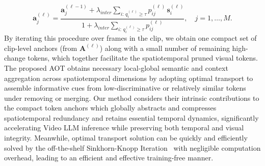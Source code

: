 \begin{equation}
    \mathbf{a}^{(\ell)}_j
    =
    \frac{
        \mathbf{a}^{(\ell-1)}_j
        +
        \lambda_{inter}
        \sum_{i:\,q^{(\ell)}_i \ge \tau}
        p^{(\ell)}_{ij}\,\mathbf{s}^{(\ell)}_i
    }{
        1
        +
        \lambda_{inter}
        \sum_{i:\,q^{(\ell)}_i \ge \tau}
        p^{(\ell)}_{ij}
    },
    \quad j=1,\dots,M.
\end{equation}
By iterating this procedure over frames in the clip, we obtain
one compact set of clip-level anchors (from $\mathbf{A}^{(\ell)}$) along with a small number of remaining high-change tokens, which together facilitate the spatiotemporal pruned visual tokens.
The proposed AOT obtains necessary local-global semantic and context aggregation across spatiotemporal dimensions by adopting optimal transport to assemble informative cues from low-discriminative or relatively similar tokens under removing or merging. Our method considers their intrinsic contributions to the compact token anchors which globally abstracts and compresses spatiotemporal redundancy and retains essential temporal dynamics, significantly accelerating Video LLM inference while preserving both temporal and visual integrity. Meanwhile, optimal transport solution can be quickly and efficiently solved by the off-the-shelf Sinkhorn-Knopp Iteration~\cite{cuturi2013sinkhorn} with negligible computation overhead, leading to an efficient and effective training-free manner.

